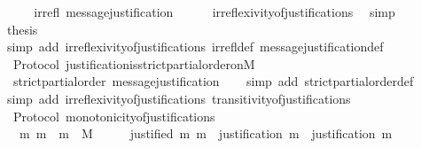 \begin{isabellebody}
%
\isadelimproof
%
\endisadelimproof
%
\isatagproof
{}\isamarkupfalse%
\ {\isacharminus}\isanewline
\ \ \isamarkupfalse%
\ {\isachardoublequoteopen}irrefl\ message{\isacharunderscore}justification{\isachardoublequoteclose}\isanewline
\ \ \ \ \isamarkupfalse%
\ irreflexivity{\isacharunderscore}of{\isacharunderscore}justifications\ \isamarkupfalse%
\ simp\ \ \isanewline
\ \ \isamarkupfalse%
\ \isamarkupfalse%
\ {\isacharquery}thesis\isanewline
\ \ \ \ \isamarkupfalse%
\ {\isacharparenleft}simp\ add{\isacharcolon}\ irreflexivity{\isacharunderscore}of{\isacharunderscore}justifications\ irrefl{\isacharunderscore}def\ message{\isacharunderscore}justification{\isacharunderscore}def{\isacharparenright}\isanewline
{}\isamarkupfalse%
%
\endisatagproof
{\isafoldproof}%
%
\isadelimproof
\isanewline
%
\endisadelimproof
\isanewline
{}\isamarkupfalse%
\ {\isacharparenleft}\ Protocol{\isacharparenright}\ justification{\isacharunderscore}is{\isacharunderscore}strict{\isacharunderscore}partial{\isacharunderscore}order{\isacharunderscore}on{\isacharunderscore}M\ {\isacharcolon}\isanewline
\ \ {\isachardoublequoteopen}strict{\isacharunderscore}partial{\isacharunderscore}order\ message{\isacharunderscore}justification{\isachardoublequoteclose}\isanewline
%
\isadelimproof
\ \ %
\endisadelimproof
%
\isatagproof
{}\isamarkupfalse%
\ {\isacharparenleft}simp\ add{\isacharcolon}\ strict{\isacharunderscore}partial{\isacharunderscore}order{\isacharunderscore}def{\isacharparenright}\isanewline
\ \ \isamarkupfalse%
\ {\isacharparenleft}simp\ add{\isacharcolon}\ irreflexivity{\isacharunderscore}of{\isacharunderscore}justifications\ transitivity{\isacharunderscore}of{\isacharunderscore}justifications{\isacharparenright}%
\endisatagproof
{\isafoldproof}%
%
\isadelimproof
\isanewline
%
\endisadelimproof
\isanewline
{}\isamarkupfalse%
\ {\isacharparenleft}\ Protocol{\isacharparenright}\ monotonicity{\isacharunderscore}of{\isacharunderscore}justifications\ {\isacharcolon}\isanewline
\ \ {\isachardoublequoteopen}{\isasymforall}\ m\ m{\isacharprime}\ {\isasymsigma}{\isachardot}\ m\ {\isasymin}\ M\ {\isasymand}\ {\isasymsigma}\ {\isasymin}\ {\isasymSigma}\ {\isasymand}\ justified\ m{\isacharprime}\ m\ {\isasymlongrightarrow}\ justification\ m{\isacharprime}\ {\isasymsubseteq}\ justification\ m{\isachardoublequoteclose}\isanewline
%
\isadelimproof
\ \ %
\endisadelimproof
%
\isatagproof

\end{isabellebody}
